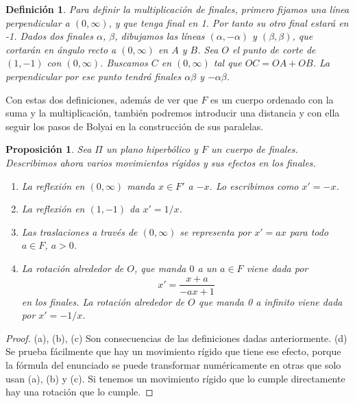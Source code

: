 \documentclass[a4paper]{amsart}
\theoremstyle{plain}
\newtheorem{definition}{Definición}
\newtheorem{proposition}{Proposición}
\begin{document}
\begin{definition}
Para definir la multiplicación de finales, primero fijamos una línea perpendicular a $(0,\infty)$, y que tenga final en 1. Por tanto su otro final estará en -1. 
Dados dos finales $\alpha$, $\beta$, dibujamos las líneas $(\alpha,-\alpha)$ y $(\beta,\beta)$, que cortarán en ángulo recto a $(0,\infty)$ en $A$ y $B$. Sea $O$ el punto de corte de $(1,-1)$ con $(0,\infty)$. 
Buscamos $C$ en $(0,\infty)$ tal que $OC=OA+OB$. La perpendicular por ese punto tendrá finales $\alpha\beta$ y $-\alpha\beta$.
\end{definition}

Con estas dos definiciones, además de ver que $F$ es un cuerpo ordenado con la suma y la multiplicación, también podremos introducir una distancia y con ella seguir los pasos de Bolyai en la construcción de sus paralelas.

\begin{proposition}
Sea $\Pi$ un plano hiperbólico y $F$ un cuerpo de finales. Describimos ahora varios movimientos rígidos y sus efectos en los finales.
\begin{enumerate}
\item [(a)] La reflexión en $(0,\infty)$ manda $x\in F'$ a $-x$. Lo escribimos como $x'=-x$.
\item [(b)] La reflexión en $(1,-1)$ da $x'=1/x$.
\item [(c)] Las traslaciones a través de $(0,\infty)$ se representa por $x'=ax$ para todo $a\in F$, $a>0$.
\item [(d)] La rotación alrededor de $O$, que manda $0$ a un $a\in F$ viene dada por
\[
x'=\frac{x+a}{-ax+1}
\]
en los finales. La rotación alrededor de $O$ que manda 0 a infinito viene dada por $x'=-1/x$.
\end{enumerate}
\end{proposition}

\begin{proof}
(a), (b), (c) Son consecuencias de las definiciones dadas anteriormente. (d) Se prueba fácilmente que hay un movimiento rígido que tiene ese efecto, porque la fórmula del enunciado se puede transformar numéricamente en otras que solo usan (a), (b) y (c). Si tenemos un movimiento rígido que lo cumple directamente hay una rotación que lo cumple.
\end{proof}
\end{document}
